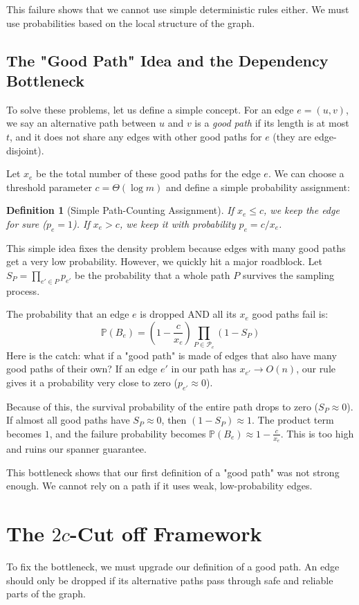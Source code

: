 \documentclass[11pt,a4paper]{article}
\newtheorem{definition}{Definition}[section]
\newcommand{\Prob}{\mathbb{P}}
\begin{document}
This failure shows that we cannot use simple deterministic rules either. We must use probabilities based on the local structure of the graph.

\subsection{The "Good Path" Idea and the Dependency Bottleneck}
To solve these problems, let us define a simple concept. For an edge $e=(u,v)$, we say an alternative path between $u$ and $v$ is a \emph{good path} if its length is at most $t$, and it does not share any edges with other good paths for $e$ (they are edge-disjoint). 

Let $x_e$ be the total number of these good paths for the edge $e$. We can choose a threshold parameter $c = \Theta(\log m)$ and define a simple probability assignment:

\begin{definition}[Simple Path-Counting Assignment]
If $x_e \le c$, we keep the edge for sure ($p_e = 1$). If $x_e > c$, we keep it with probability $p_e = c/x_e$.
\end{definition}

This simple idea fixes the density problem because edges with many good paths get a very low probability. However, we quickly hit a major roadblock. Let $S_P = \prod_{e' \in P} p_{e'}$ be the probability that a whole path $P$ survives the sampling process. 

The probability that an edge $e$ is dropped AND all its $x_e$ good paths fail is:
\[
\Prob(B_e) = \left( 1 - \frac{c}{x_e} \right) \prod_{P \in \mathcal{P}_e} (1 - S_P)
\]
Here is the catch: what if a "good path" is made of edges that also have many good paths of their own? If an edge $e'$ in our path has $x_{e'} \to O(n)$, our rule gives it a probability very close to zero ($p_{e'} \approx 0$). 

Because of this, the survival probability of the entire path drops to zero ($S_P \approx 0$). If almost all good paths have $S_P \approx 0$, then $(1 - S_P) \approx 1$. The product term becomes $1$, and the failure probability becomes $\Prob(B_e) \approx 1 - \frac{c}{x_e}$. This is too high and ruins our spanner guarantee. 

This bottleneck shows that our first definition of a "good path" was not strong enough. We cannot rely on a path if it uses weak, low-probability edges.


\section{The $2c$-Cut off Framework}
To fix the bottleneck, we must upgrade our definition of a good path. An edge should only be dropped if its alternative paths pass through safe and reliable parts of the graph.
\end{document}
